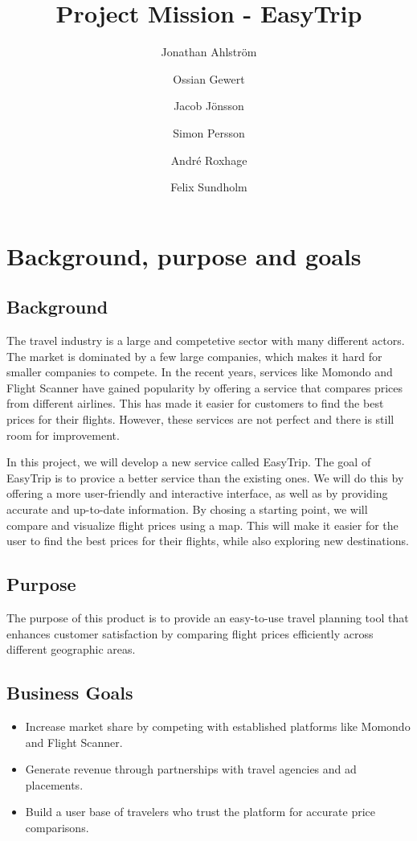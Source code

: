 \documentclass[a4paper]{article}
\title{Project Mission - EasyTrip}
\author{Jonathan Ahlström \and Ossian Gewert \and Jacob Jönsson \and Simon Persson \and André Roxhage \and Felix Sundholm}
\begin{document}
\begin{center}
\end{center}

\tableofcontents  %

\section{Background, purpose and goals}
\subsection{Background}
The travel industry is a large and competetive sector with many different actors.
The market is dominated by a few large companies,
which makes it hard for smaller companies to compete.
In the recent years,
services like Momondo and Flight Scanner have gained popularity by offering a service that compares prices from different airlines.
This has made it easier for customers to find the best prices for their flights.
However, these services are not perfect and there is still room for improvement. 

In this project, we will develop a new service called EasyTrip. The goal of EasyTrip is to provice a better service than the existing ones. We will do this by offering a more user-friendly and interactive interface, as well as by providing accurate and up-to-date information. By chosing a starting point, we will compare and visualize flight prices using a map. This will make it easier for the user to find the best prices for their flights, while also exploring new destinations.

\subsection{Purpose}
The purpose of this product is to provide an easy-to-use travel planning tool that enhances customer satisfaction by comparing flight prices efficiently across different geographic areas.

\subsection{Business Goals}
\begin{itemize}
    \item Increase market share by competing with established platforms like Momondo and Flight Scanner.
    \item Generate revenue through partnerships with travel agencies and ad placements.
    \item Build a user base of travelers who trust the platform for accurate price comparisons.
\end{itemize}
\end{document}
